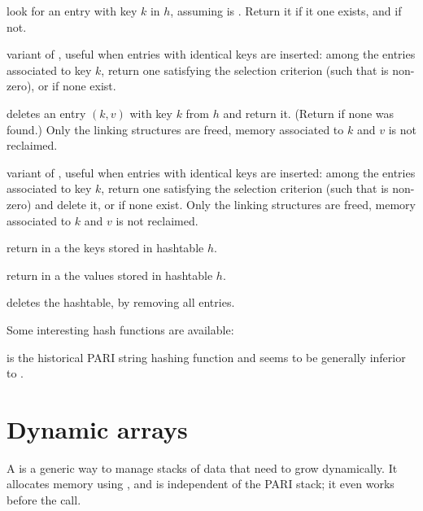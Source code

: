  look for an
entry with key $k$ in $h$, assuming  is . Return
it if it one exists, and  if not.

 variant of , useful when entries
with identical keys are inserted: among the entries associated to
key $k$, return one satisfying the selection criterion (such that
 is non-zero), or  if none exist.

 deletes an entry $(k,v)$
with key $k$ from $h$ and return it. (Return  if none was found.)
Only the linking structures are freed, memory associated to $k$ and $v$
is not reclaimed.

variant of , useful when entries with identical keys are
inserted: among the entries associated to key $k$, return one satisfying the
selection criterion (such that  is non-zero) and delete it, or
 if none exist. Only the linking structures are freed, memory
associated to $k$ and $v$ is not reclaimed.

 return in a  the keys
stored in hashtable $h$.

 return in a 
the values stored in hashtable $h$.

 deletes the hashtable, by removing all
entries.

Some interesting hash functions are available:


 is the historical PARI string hashing
function and seems to be generally inferior to .


\section{Dynamic arrays}

A  is a generic way to manage stacks of data that need
to grow dynamically. It allocates memory using , and is
independent of the PARI stack; it even works before the  call.

